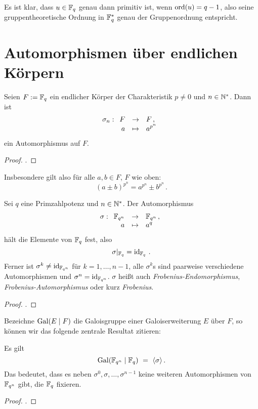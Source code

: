 \begin{bemerkung}
  Es ist klar, dass $u\in \mathbb{F}_q$ genau dann primitiv ist, wenn 
  $\operatorname{ord}(u) = q-1$, also seine gruppentheoretische Ordnung in $\mathbb{F}_q^\ast$ genau
  der Gruppenordnung entspricht.
\end{bemerkung}


\section{Automorphismen über endlichen Körpern}

\begin{satz}
  \label{satz:frob_auto}
  Seien $F := \mathbb{F}_q$ ein endlicher Körper der Charakteristik $p\neq 0$ und 
  $n\in \mathbb{N}^\ast$. Dann ist
  \[ \sigma_n: \funcdef{F &\to& F\,,\\
    a &\mapsto& a^{p^n}}\]
  ein Automorphismus auf $F$.
\end{satz}
\begin{proof}
  \autocite[Corollary 3.18]{wan2003lectures}.
\end{proof}

\begin{bemerkung}
  Insbesondere gilt also für alle $a,b\in F$, $F$ wie oben:
  \[ (a\pm b)^{p^n} = a^{p^n} \pm b^{p^n}\,.\]
\end{bemerkung}

\begin{satz}
  \label{satz:frob_fix}
  Sei $q$ eine Primzahlpotenz und $n\in \mathbb{N}^\ast$. Der Automorphismus
  \[ \sigma: \funcdef{\F_{q^n} &\to& \F_{q^n}\,,\\
    a &\mapsto& a^q}\]
  hält die Elemente von $\mathbb{F}_q$ fest, also 
  \[ \sigma |_{\mathbb{F}_q} = \operatorname{id}_{\mathbb{F}_q}\,.\]
  Ferner ist $\sigma^k \neq \operatorname{id}_{\mathbb{F}_{q^n}}$ für $k=1,\ldots,n-1$, alle
  $\sigma^k$s sind paarweise verschiedene Automorphismen und 
  $\sigma^n = \operatorname{id}_{\mathbb{F}_{q^n}}$.
  $\sigma$ heißt auch \emph{Frobenius-Endomorphismus},
  \emph{Frobenius-Automorphismus} oder kurz \emph{Frobenius}.
\end{satz}
\begin{proof}
  \autocite[Theorem 7.1]{wan2003lectures}.
\end{proof}


Bezeichne $\operatorname{Gal}(E \mid F)$ die Galoisgruppe einer Galoiserweiterung $E$ über
$F$, so können wir das folgende zentrale Resultat zitieren:

\begin{satz}
  \label{satz:frob_sind_alle_autos}
  Es gilt
  \[ \operatorname{Gal}(\mathbb{F}_{q^n}\mid \mathbb{F}_q) \ =\  \langle \sigma\rangle\,.\]
  Das bedeutet, dass es neben $\sigma^0,\sigma,\ldots,\sigma^{n-1}$ keine weiteren
  Automorphismen von $\mathbb{F}_{q^n}$ gibt, die $\mathbb{F}_q$ fixieren.
\end{satz}
\begin{proof}
  \autocite[Theorem 7.3]{wan2003lectures}.
\end{proof}

